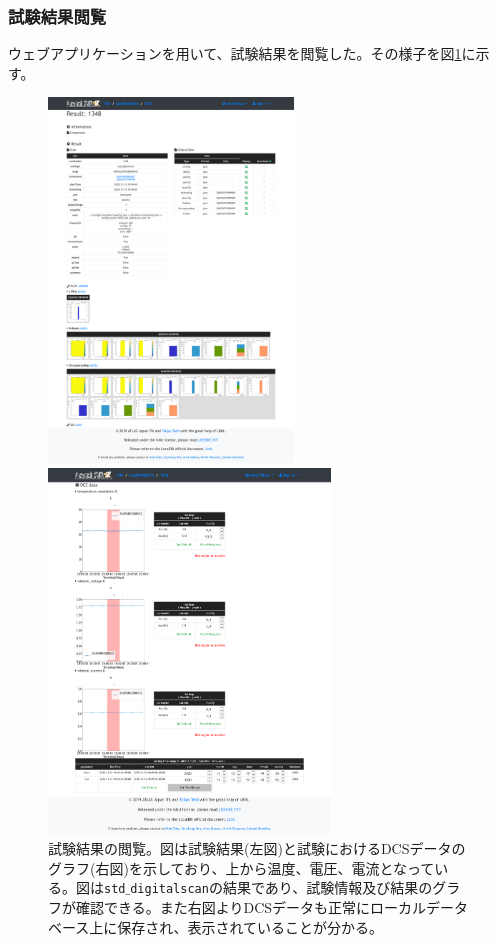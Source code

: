 \clearpage
\subsubsection{試験結果閲覧}
ウェブアプリケーションを用いて、試験結果を閲覧した。その様子を図\ref{demo_view_result}に示す。
\begin{figure}[bpt]\centering
  \begin{minipage}{0.45\hsize}
    \begin{center}
    \includegraphics[width=65mm]{demo_view_scan_result.pdf}
    \end{center}
  \end{minipage}
  \begin{minipage}{0.45\hsize}
    \begin{center}
    \includegraphics[width=75mm]{demo_view_dcs.pdf}
    \end{center}
  \end{minipage}
  \caption[試験結果の閲覧]{試験結果の閲覧。図は試験結果(左図)と試験におけるDCSデータのグラフ(右図)を示しており、上から温度、電圧、電流となっている。図は\texttt{std$\_$digitalscan}の結果であり、試験情報及び結果のグラフが確認できる。また右図よりDCSデータも正常にローカルデータベース上に保存され、表示されていることが分かる。}
  \label{demo_view_result}
\end{figure}


